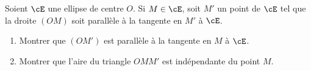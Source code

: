 \begin{enonce}
\begin{exercise}[ID={RMS 122-2 E1305 TPE PSI},subtitle={},tags={}]
Soient $\cE$ une ellipse de centre $O$.
Si $M\in\cE$, soit $M'$ un point de $\cE$ tel que la droite $\left(OM\right)$ soit parallèle à la tangente en $M'$ à $\cE$.
\begin{enumerate}
  \item Montrer que $\left( OM' \right)$ est parallèle à la tangente en $M$ à $\cE$.
  \item Montrer que l'aire du triangle $OMM'$ est indépendante du point $M$.
\end{enumerate}
\end{exercise}
\begin{solution}
\end{solution}
\end{enonce}
